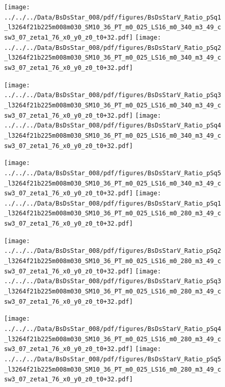 \documentclass[a4paper,10pt]{article}
\begin{document}
\begin{figure}[p]
 \texttt{[image: ../../../Data/BsDsStar\_008/pdf/figures/BsDsStarV\_Ratio\_pSq1\_l3264f21b225m008m030\_SM10\_36\_PT\_m0\_025\_LS16\_m0\_340\_m3\_49\_csw3\_07\_zeta1\_76\_x0\_y0\_z0\_t0+32.pdf]} 
 \texttt{[image: ../../../Data/BsDsStar\_008/pdf/figures/BsDsStarV\_Ratio\_pSq2\_l3264f21b225m008m030\_SM10\_36\_PT\_m0\_025\_LS16\_m0\_340\_m3\_49\_csw3\_07\_zeta1\_76\_x0\_y0\_z0\_t0+32.pdf]} 
 \end{figure}
\begin{figure}[p]
 \texttt{[image: ../../../Data/BsDsStar\_008/pdf/figures/BsDsStarV\_Ratio\_pSq3\_l3264f21b225m008m030\_SM10\_36\_PT\_m0\_025\_LS16\_m0\_340\_m3\_49\_csw3\_07\_zeta1\_76\_x0\_y0\_z0\_t0+32.pdf]} 
 \texttt{[image: ../../../Data/BsDsStar\_008/pdf/figures/BsDsStarV\_Ratio\_pSq4\_l3264f21b225m008m030\_SM10\_36\_PT\_m0\_025\_LS16\_m0\_340\_m3\_49\_csw3\_07\_zeta1\_76\_x0\_y0\_z0\_t0+32.pdf]} 
 \end{figure}
\begin{figure}[p]
 \texttt{[image: ../../../Data/BsDsStar\_008/pdf/figures/BsDsStarV\_Ratio\_pSq5\_l3264f21b225m008m030\_SM10\_36\_PT\_m0\_025\_LS16\_m0\_340\_m3\_49\_csw3\_07\_zeta1\_76\_x0\_y0\_z0\_t0+32.pdf]} 
 \texttt{[image: ../../../Data/BsDsStar\_008/pdf/figures/BsDsStarV\_Ratio\_pSq1\_l3264f21b225m008m030\_SM10\_36\_PT\_m0\_025\_LS16\_m0\_280\_m3\_49\_csw3\_07\_zeta1\_76\_x0\_y0\_z0\_t0+32.pdf]} 
 \end{figure}
\clearpage
\begin{figure}[p]
 \texttt{[image: ../../../Data/BsDsStar\_008/pdf/figures/BsDsStarV\_Ratio\_pSq2\_l3264f21b225m008m030\_SM10\_36\_PT\_m0\_025\_LS16\_m0\_280\_m3\_49\_csw3\_07\_zeta1\_76\_x0\_y0\_z0\_t0+32.pdf]} 
 \texttt{[image: ../../../Data/BsDsStar\_008/pdf/figures/BsDsStarV\_Ratio\_pSq3\_l3264f21b225m008m030\_SM10\_36\_PT\_m0\_025\_LS16\_m0\_280\_m3\_49\_csw3\_07\_zeta1\_76\_x0\_y0\_z0\_t0+32.pdf]} 
 \end{figure}
\begin{figure}[p]
 \texttt{[image: ../../../Data/BsDsStar\_008/pdf/figures/BsDsStarV\_Ratio\_pSq4\_l3264f21b225m008m030\_SM10\_36\_PT\_m0\_025\_LS16\_m0\_280\_m3\_49\_csw3\_07\_zeta1\_76\_x0\_y0\_z0\_t0+32.pdf]} 
 \texttt{[image: ../../../Data/BsDsStar\_008/pdf/figures/BsDsStarV\_Ratio\_pSq5\_l3264f21b225m008m030\_SM10\_36\_PT\_m0\_025\_LS16\_m0\_280\_m3\_49\_csw3\_07\_zeta1\_76\_x0\_y0\_z0\_t0+32.pdf]} 
 \end{figure}
\clearpage
\end{document}
